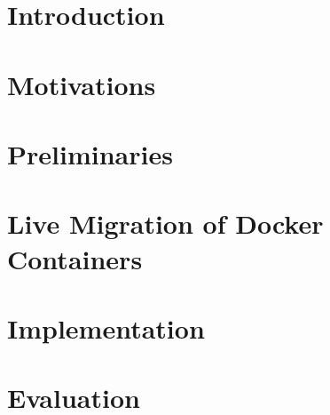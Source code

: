 \documentclass[sigconf]{acmart}
\begin{document}


\begin{abstract}

\end{abstract}





\maketitle

% 

\section{Introduction}


\section{Motivations}



% 

\section{Preliminaries}



\section{Live Migration of Docker Containers}



\section{Implementation}



\section{Evaluation}
\end{document}
